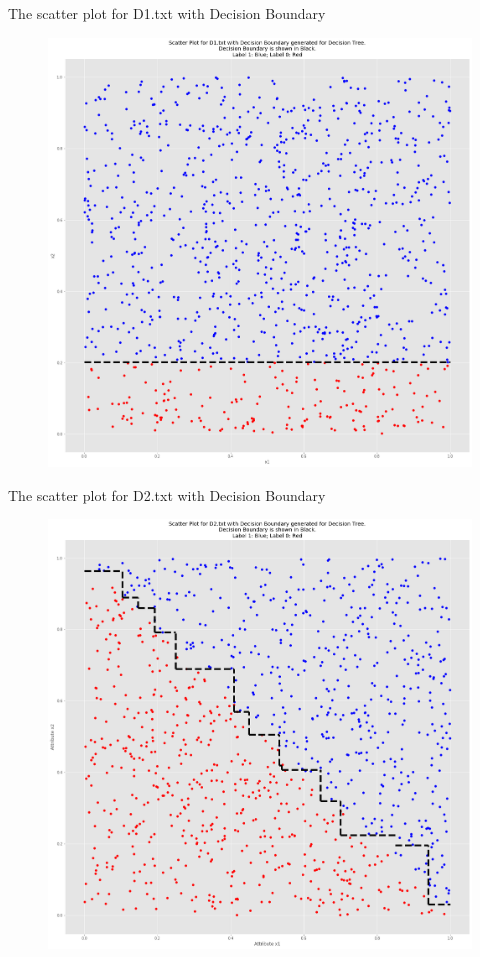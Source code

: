 \documentclass[a4paper]{article}
\theoremstyle{definition}
\newenvironment{soln}{
    \leavevmode\color{blue}\ignorespaces
}{}
\begin{document}
\begin{enumerate}
\begin{itemize}
    \begin{soln}
  	The scatter plot for D1.txt with Decision Boundary
  	  	\begin{figure}[H]
  		\centering
  		\includegraphics[width=1.1\textwidth]{D1_DecisionBoundary.png}
  		\captionsetup{labelformat=empty}
  		\caption{}
  		\label{fig:my_label}
  	\end{figure}
  	
  	The scatter plot for D2.txt with Decision Boundary
  	
  	  	\begin{figure}[H]
  		\centering
  		\includegraphics[width=1.1\textwidth]{D2_DecisionBoundary.png}
  		\captionsetup{labelformat=empty}
  		\caption{}
  		\label{fig:my_label}
  	\end{figure}
  	

\end{soln}
\end{itemize}
\end{enumerate}
\end{document}
